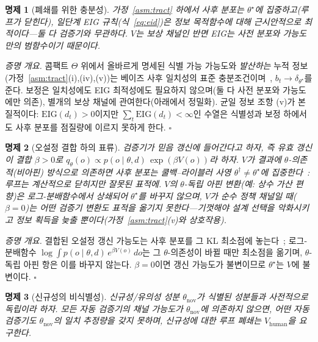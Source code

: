 \documentclass[11pt]{article}
\newtheorem{proposition}{명제}
\begin{document}
\begin{proposition}[폐쇄를 위한 충분성]
\label{prop:suff}
가정~\ref{asm:tract} 하에서 사후 분포는 $\theta^\star$에 집중하고(루프가 닫힌다), 일단계 EIG 규칙(식~\ref{eq:eid})은 정보 목적함수에 대해 근시안적으로 최적이다---둘 다 검증기와 무관하다. $V$는 보상 채널인 반면 EIG는 사전 분포와 가능도만의 범함수이기 때문이다.
\end{proposition}

\noindent\emph{증명 개요.} 콤팩트 $\Theta$ 위에서 올바르게 명세된 식별 가능 가능도와 \emph{발산하는} 누적 정보(가정~\ref{asm:tract}(i),(iv),(v))는 베이즈 사후 일치성의 표준 충분조건이며~\citep{ghosal2017fundamentals}, $b_t \to \delta_{\theta^\star}$를 준다. 보정은 일치성에도 EIG 최적성에도 필요하지 않으며(둘 다 사전 분포와 가능도에만 의존), 별개의 보상 채널에 관여한다(아래에서 정밀화). 균일 정보 조항 (v)가 본질적이다: $\mathrm{EIG}(d_t)>0$이지만 $\sum_t \mathrm{EIG}(d_t)<\infty$인 수열은 식별성과 보정 하에서도 사후 분포를 점질량에 이르지 못하게 한다. $\square$

\begin{proposition}[오설정 결합 하의 표류]
\label{prop:drift}
검증기가 믿음 갱신에 들어간다고 하자, 즉 유효 갱신이 결합 $\beta>0$로 $q_\theta(o) \propto p(o \mid \theta, d)\,\exp(\beta V(o))$라 하자. $V$가 결과에 $\theta$-의존적(비아핀) 방식으로 의존하면 사후 분포는 쿨백--라이블러 사영 $\theta^\dagger \neq \theta^\star$에 집중한다~\citep{berk1966}: 루프는 계산적으로 닫히지만 잘못된 표적에. $V$의 $\theta$-독립 아핀 변환(예: 상수 가산 편향)은 로그-분배함수에서 상쇄되어 $\theta^\star$를 바꾸지 않으며, $V$가 순수 정책 채널일 때($\beta=0$)는 어떤 검증기 변환도 표적을 옮기지 못한다---기껏해야 설계 선택을 악화시키고 정보 획득을 늦출 뿐이다(가정~\ref{asm:tract}(v)와 상호작용).
\end{proposition}

\noindent\emph{증명 개요.} 결합된 오설정 갱신 가능도는 사후 분포를 그 KL 최소점에 놓는다~\citep{berk1966}; 로그-분배함수 $\log\!\int p(o\mid\theta,d)\,e^{\beta V(o)}\,do$는 그 $\theta$-의존성이 바뀔 때만 최소점을 옮기며, $\theta$-독립 아핀 항은 이를 바꾸지 않는다. $\beta=0$이면 갱신 가능도가 불변이므로 $\theta^\star$는 $V$에 불변이다. $\square$

\begin{proposition}[신규성의 비식별성]
\label{prop:novelty}
신규성/유의성 성분 $\theta_{\mathrm{nov}}$가 식별된 성분들과 사전적으로 독립이라 하자. 모든 자동 검증기의 채널 가능도가 $\theta_{\mathrm{nov}}$에 의존하지 않으면, 어떤 자동 검증기도 $\theta_{\mathrm{nov}}$의 일치 추정량을 갖지 못하며, 신규성에 대한 루프 폐쇄는 $V_{\mathrm{human}}$을 요구한다.
\end{proposition}
\end{document}
